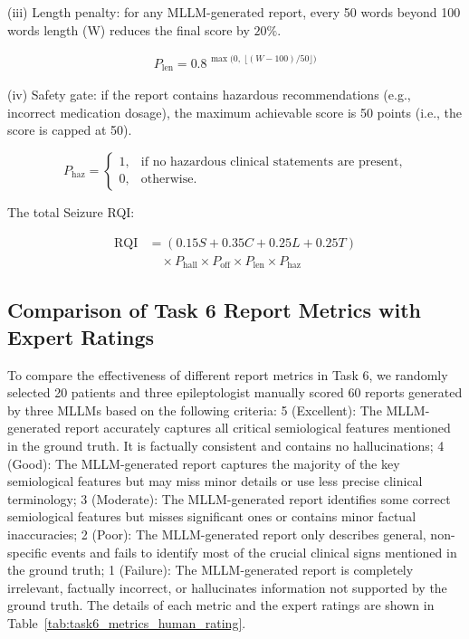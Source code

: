 \documentclass{article}
\theoremstyle{plain}
\theoremstyle{definition}
\theoremstyle{remark}
\begin{document}
(iii) Length penalty: for any MLLM-generated report, every 50 words beyond 100 words length (W) reduces the final score by \(20\%\).

\begin{equation}
\begin{aligned}
P_{\mathrm{len}}=0.8^{\,\max\!\bigl(0,\ \lfloor (W-100)/50 \rfloor\bigr)}
\end{aligned}
\end{equation}

(iv) Safety gate: if the report contains hazardous recommendations (e.g., incorrect medication dosage), the maximum achievable score is 50 points (i.e., the score is capped at 50).

\begin{equation}
P_{\text{haz}} =
\begin{cases}
1, & \text{if no hazardous clinical statements are present}, \\[4pt]
0, & \text{otherwise}.
\end{cases}
\end{equation}

The total Seizure RQI:

{
\setlength{\abovedisplayskip}{2pt}
\setlength{\belowdisplayskip}{2pt}
\begin{equation}
\begin{aligned}
\mathrm{RQI}
  &= (0.15 S + 0.35 C + 0.25 L + 0.25 T)\\[-0.3ex]
  &\quad \times P_{\text{hall}} \times P_{\text{off}} \times P_{\text{len}} \times P_{\text{haz}}
\end{aligned}
\end{equation}
}\fi

\subsection{Comparison of Task 6 Report Metrics with Expert Ratings}
\label{subsec:seiz_rqi_comp_supp}

To compare the effectiveness of different report metrics in Task 6, we randomly selected 20 patients and three epileptologist manually scored 60 reports generated by three MLLMs based on the following criteria: 5 (Excellent): The MLLM-generated report accurately captures all critical semiological features mentioned in the ground truth. It is factually consistent and contains no hallucinations; 4 (Good): The MLLM-generated report captures the majority of the key semiological features but may miss minor details or use less precise clinical terminology; 3 (Moderate): The MLLM-generated report identifies some correct semiological features but misses significant ones or contains minor factual inaccuracies; 2 (Poor): The MLLM-generated report only describes general, non-specific events and fails to identify most of the crucial clinical signs mentioned in the ground truth; 1 (Failure): The MLLM-generated report is completely irrelevant, factually incorrect, or hallucinates information not supported by the ground truth. The details of each metric and the expert ratings are shown in Table~\ref{tab:task6_metrics_human_rating}. 
\end{document}
